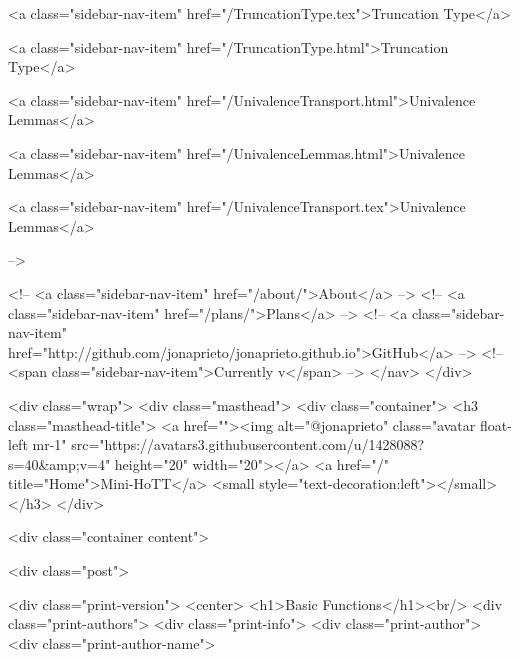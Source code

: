       
    
      
        
          <a class="sidebar-nav-item" href="/TruncationType.tex">Truncation Type</a>
        
      
    
      
        
          <a class="sidebar-nav-item" href="/TruncationType.html">Truncation Type</a>
        
      
    
      
        
          <a class="sidebar-nav-item" href="/UnivalenceTransport.html">Univalence Lemmas</a>
        
      
    
      
        
          <a class="sidebar-nav-item" href="/UnivalenceLemmas.html">Univalence Lemmas</a>
        
      
    
      
        
          <a class="sidebar-nav-item" href="/UnivalenceTransport.tex">Univalence Lemmas</a>
        
      
     -->

    <!-- <a class="sidebar-nav-item" href="/about/">About</a> -->
    <!-- <a class="sidebar-nav-item" href="/plans/">Plans</a> -->
    <!-- <a class="sidebar-nav-item" href="http://github.com/jonaprieto/jonaprieto.github.io">GitHub</a> -->
    <!-- <span class="sidebar-nav-item">Currently v</span> -->
  </nav>
</div>

    <div class="wrap">
      <div class="masthead">
        <div class="container">
          <h3 class="masthead-title">
            <a href=""><img alt="@jonaprieto" class="avatar float-left mr-1" src="https://avatars3.githubusercontent.com/u/1428088?s=40&amp;v=4" height="20" width="20"></a>
            <a href="/" title="Home">Mini-HoTT</a>
            <small style="text-decoration:left"></small>
          </h3>
        </div>
      
      <div class="container content">
        







<div class="post">

  <div class="print-version">
    <center>
      <h1>Basic Functions</h1><br/>
        <div class="print-authors">
          <div class="print-info">
            <div class="print-author">
              <div class="print-author-name">
                
